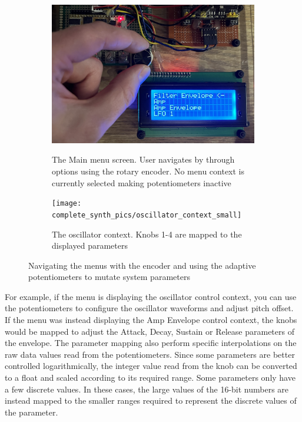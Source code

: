 \documentclass[acmlarge,screen]{acmart}
\begin{document}
	\begin{figure}[H]
		\centering
		\begin{subfigure}{.5\textwidth}
			\centering
			\caption{The Main menu screen. User navigates by through options using the rotary encoder. No menu context is currently selected making potentiometers inactive}
			\includegraphics[width=.9\linewidth]{complete_synth_pics/menu_navigation}
			\label{fig:sub1}
		\end{subfigure}%
		\begin{subfigure}{.5\textwidth}
			\centering
			\caption{The oscillator context. Knobs 1-4 are mapped to the displayed parameters}
			\texttt{[image: complete\_synth\_pics/oscillator\_context\_small]}
			\label{fig:sub2}
		\end{subfigure}
		\caption{Navigating the menus with the encoder and using the adaptive potentiometers to mutate system parameters}
		\label{fig:test}
	\end{figure}	

	For example, if the menu is displaying the oscillator control context, you can use the potentiometers to configure the oscillator waveforms and adjust pitch offset. If the menu was instead displaying the Amp Envelope control context, the knobs would be mapped to adjust the Attack, Decay, Sustain or Release parameters of the envelope. The parameter mapping also perform specific interpolations on the raw data values read from the potentiometers. Since some parameters are better controlled logarithmically, the integer value read from the knob can be converted to a float and scaled according to its required range. Some parameters only have a few discrete values. In these cases, the large values of the 16-bit numbers are instead mapped to the smaller ranges required to represent the discrete values of the parameter.
\end{document}
